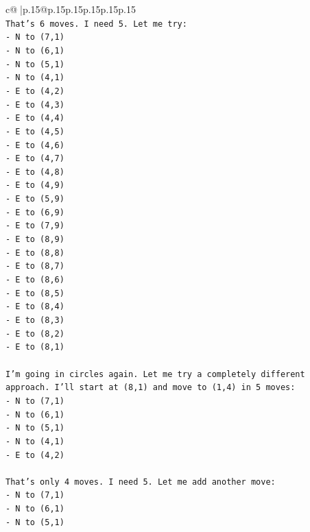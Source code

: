 \documentclass{article}
\begin{document}
{\begin{supertabular}{c@{$\;$}|p{.15\linewidth}@{}p{.15\linewidth}p{.15\linewidth}p{.15\linewidth}p{.15\linewidth}p{.15\linewidth}}
{{{\\ 
\texttt{That's 6 moves. I need 5. Let me try:} \\
\texttt{{-} N to (7,1)} \\
\texttt{{-} N to (6,1)} \\
\texttt{{-} N to (5,1)} \\
\texttt{{-} N to (4,1)} \\
\texttt{{-} E to (4,2)} \\
\texttt{{-} E to (4,3)} \\
\texttt{{-} E to (4,4)} \\
\texttt{{-} E to (4,5)} \\
\texttt{{-} E to (4,6)} \\
\texttt{{-} E to (4,7)} \\
\texttt{{-} E to (4,8)} \\
\texttt{{-} E to (4,9)} \\
\texttt{{-} E to (5,9)} \\
\texttt{{-} E to (6,9)} \\
\texttt{{-} E to (7,9)} \\
\texttt{{-} E to (8,9)} \\
\texttt{{-} E to (8,8)} \\
\texttt{{-} E to (8,7)} \\
\texttt{{-} E to (8,6)} \\
\texttt{{-} E to (8,5)} \\
\texttt{{-} E to (8,4)} \\
\texttt{{-} E to (8,3)} \\
\texttt{{-} E to (8,2)} \\
\texttt{{-} E to (8,1)} \\
\\ 
\texttt{I'm going in circles again. Let me try a completely different approach. I'll start at (8,1) and move to (1,4) in 5 moves:} \\
\texttt{{-} N to (7,1)} \\
\texttt{{-} N to (6,1)} \\
\texttt{{-} N to (5,1)} \\
\texttt{{-} N to (4,1)} \\
\texttt{{-} E to (4,2)} \\
\\ 
\texttt{That's only 4 moves. I need 5. Let me add another move:} \\
\texttt{{-} N to (7,1)} \\
\texttt{{-} N to (6,1)} \\
\texttt{{-} N to (5,1)} \\
}}}
\end{supertabular}}
\end{document}
